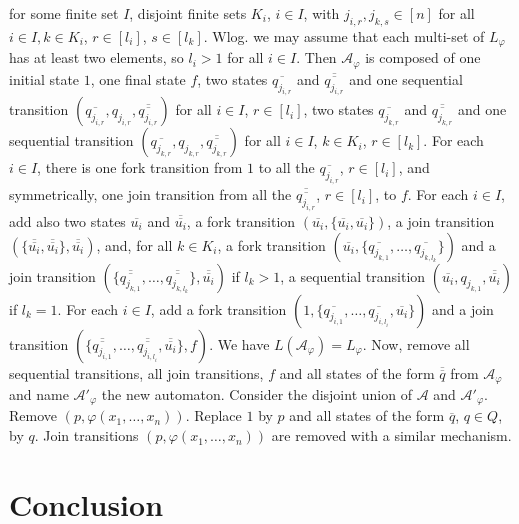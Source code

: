 \documentclass{CSML}
\begin{document}
\begin{Proof}
for some finite set $I$, disjoint finite sets $K_i$, $i\in I$, with $j_{i,r}, j_{k,s}\in[n]$ for all $i\in I, k\in K_i$, $r\in[l_i]$, $s\in[l_k]$. Wlog. we may assume that each multi-set of $L_\varphi$ has at least two elements, so $l_i>1$ for all $i\in I$. Then $\mathcal{A}_\varphi$ is composed of one initial state $1$, one final state $f$, two states $\overline{q_{j_{i,r}}}$ and $\overline{\overline{q_{j_{i,r}}}}$ and one sequential transition $(\overline{q_{j_{i,r}}},q_{j_{i,r}},\overline{\overline{q_{j_{i,r}}}})$ for all $i\in I$, $r\in[l_i]$, two states $\overline{q_{j_{k,r}}}$ and $\overline{\overline{q_{j_{k,r}}}}$ and one sequential transition $(\overline{q_{j_{k,r}}},q_{j_{k,r}},\overline{\overline{q_{j_{k,r}}}})$ for all $i\in I$, $k\in K_i$, $r\in[l_k]$. For each $i\in I$, there is one fork transition from $1$ to all the $\overline{q_{j_{i,r}}}$, $r\in[l_i]$, and symmetrically, one join transition from all the $\overline{\overline{q_{j_{i,r}}}}$, $r\in[l_i]$, to $f$. For each $i\in I$, add also two states $\overline{u_i}$ and $\overline{\overline{u_i}}$, a fork transition $(\overline{u_i},\{\overline{u_i},\overline{u_i}\})$, a join transition $(\{\overline{\overline{u_i}},\overline{\overline{u_i}}\},\overline{\overline{u_i}})$, and, for all $k\in K_i$, a fork transition $(\overline{u_i},\{\overline{q_{j_{k,1}}},\dots,\overline{q_{j_{k,l_k}}}\})$ and a join transition $(\{\overline{\overline{q_{j_{k,1}}}},\dots,\overline{\overline{q_{j_{k,l_k}}}}\},\overline{\overline{u_i}})$ if $l_k>1$, a sequential transition $(\overline{u_i},q_{j_{k,1}},\overline{\overline{u_i}})$ if $l_k=1$. For each $i\in I$, add a fork transition $(1,\{\overline{q_{j_{i,1}}},\dots,\overline{q_{j_{i,l_i}}},\overline{u_i}\})$ and a join transition $(\{\overline{\overline{q_{j_{i,1}}}},\dots,\overline{\overline{q_{j_{i,l_i}}}},\overline{\overline{u_i}}\},f)$. We have $L(\mathcal{A}_\varphi)=L_\varphi$. Now, remove all sequential transitions, all join transitions, $f$ and all states of the form $\overline{\overline{q}}$ from $\mathcal{A}_\varphi$ and name $\mathcal{A}'_\varphi$ the new automaton. Consider the disjoint union of $\mathcal{A}$ and $\mathcal{A}'_\varphi$. Remove $(p,\varphi(x_1,\dots,x_n))$. Replace $1$ by $p$ and all states of the form $\overline{q}$, $q\in Q$, by $q$. 
Join transitions $(p,\varphi(x_1,\dots,x_n))$ are removed with a similar mechanism.
\end{Proof}

\section{Conclusion}
\label{sec:conclusion}
\end{document}
